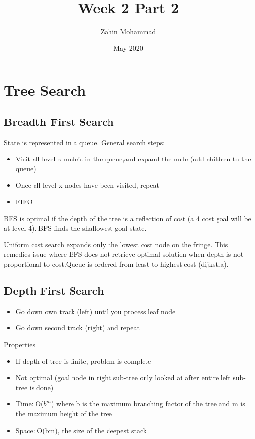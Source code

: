 \documentclass{article}
\title{Week 2 Part 2}
\author{Zahin Mohammad}
\date{May 2020}
\begin{document}
\maketitle
\section{Tree Search}
\subsection{Breadth First Search}

State is represented in a queue.
General search steps:
\begin{itemize}
    \item Visit all level x node's in the queue,and expand the node (add children to the queue)
    \item Once all level x nodes have been visited, repeat
    \item FIFO
\end{itemize}
BFS is optimal if the depth of the tree is a reflection of cost (a 4 cost goal will be at level 4). BFS finds the shallowest goal state.
\setlength{\parskip}{6pt}

Uniform cost search expands only the lowest cost node on the fringe. This remedies issue where BFS does not retrieve optimal solution when depth is not proportional to cost.Queue is ordered from least to highest cost (dijkstra).

\subsection{Depth First Search}

\begin{itemize}
    \item Go down own track (left) until you process leaf node
    \item Go down second track (right) and repeat 
\end{itemize}

Properties:
\begin{itemize}
\item If depth of tree is finite, problem is complete
\item Not optimal (goal node in right sub-tree only looked at after entire left sub-tree is done)
\item Time: O($b^m$) where b is the maximum branching factor of the tree and m is the maximum height of the tree
\item Space: O(bm), the size of the deepest stack
\end{itemize}
\end{document}
